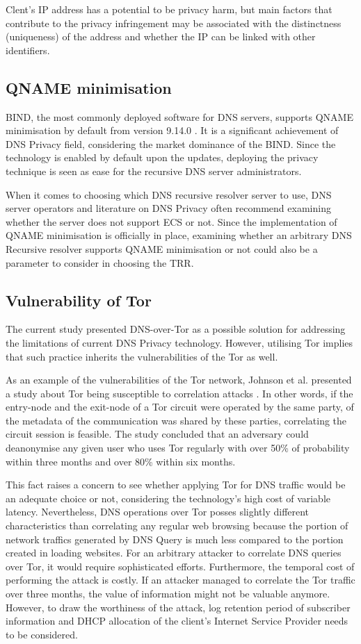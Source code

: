 Clent's IP address has a potential to be privacy harm, but main factors that contribute to the privacy infringement may be associated with the distinctness (uniqueness) of the address and whether the IP can be linked with other identifiers.

\subsection{QNAME minimisation}
BIND, the most commonly deployed software for DNS servers, supports QNAME minimisation by default from version 9.14.0 \cite{bind9qname}.
It is a significant achievement of DNS Privacy field, considering the market dominance of the BIND. Since the technology is enabled by default upon the updates, deploying the privacy technique is seen as ease for the recursive DNS server administrators.

When it comes to choosing which DNS recursive resolver server to use, DNS server operators and literature on DNS Privacy often recommend examining whether the server does not support ECS or not. Since the implementation of QNAME minimisation is officially in place, examining whether an arbitrary DNS Recursive resolver supports QNAME minimisation or not could also be a parameter to consider in choosing the TRR.

\subsection{Vulnerability of Tor}
The current study presented DNS-over-Tor as a possible solution for addressing the limitations of current DNS Privacy technology. However, utilising Tor implies that such practice inherits the vulnerabilities of the Tor as well. 

As an example of the vulnerabilities of the Tor network, Johnson et al. presented a study about Tor being susceptible to correlation attacks \cite{Johnson2013}.
In other words, if the entry-node and the exit-node of a Tor circuit were operated by the same party, of the metadata of the communication was shared by these parties, correlating the circuit session is feasible.
The study concluded that an adversary could deanonymise any given user who uses Tor regularly with over 50\% of probability within three months and over 80\% within six months.

This fact raises a concern to see whether applying Tor for DNS traffic would be an adequate choice or not, considering the technology's high cost of variable latency.
Nevertheless, DNS operations over Tor posses slightly different characteristics than correlating any regular web browsing because the portion of network traffics generated by DNS Query is much less compared to the portion created in loading websites.
For an arbitrary attacker to correlate DNS queries over Tor, it would require sophisticated efforts. Furthermore, the temporal cost of performing the attack is costly.
If an attacker managed to correlate the Tor traffic over three months, the value of information might not be valuable anymore.
However, to draw the worthiness of the attack, log retention period of subscriber information and DHCP allocation of the client's Internet Service Provider needs to be considered.